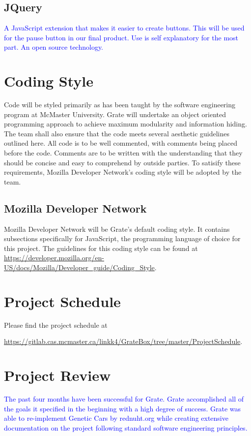 \documentclass{article}
\begin{document}
\subsection{JQuery}
\textcolor{blue}{
A JavaScript extension that makes it easier to create buttons. This will be used 
for the pause button in our final product. Use is self explanatory for the most 
part. An open source technology.}

\section{Coding Style}

Code will be styled primarily as has been taught by the software engineering 
program at McMaster University. Grate will undertake an object oriented 
programming approach to achieve maximum modularity and information hiding. The 
team shall also ensure that the code meets several aesthetic guidelines outlined 
here. All code is to be well commented, with comments being placed before the 
code. Comments are to be written with the understanding that they should be 
concise and easy to comprehend by outside parties. To satisify these 
requirements, Mozilla Developer Network's coding style will be adopted by the 
team. 

\subsection{Mozilla Developer Network}

Mozilla Developer Network will be Grate's default coding style. It contains 
subsections specifically for JavaScript, the programming language of choice for 
this project.  The guidelines for this coding style can be found at
\href{https://developer.mozilla.org/en-US/docs/Mozilla/Developer\_guide/Coding\_Style}{https://developer.mozilla.org/en-US/docs/Mozilla/Developer\_guide/Coding\_Style}.

\section{Project Schedule}
Please find the project schedule at 

\href{https://gitlab.cas.mcmaster.ca/linkk4/GrateBox/tree/master/ProjectSchedule} 
{https://gitlab.cas.mcmaster.ca/linkk4/GrateBox/tree/master/ProjectSchedule}.

\section{Project Review}
\textcolor{blue}{The past four months have been successful for Grate. Grate 
accomplished all of 
the goals it specified in the beginning with a high degree of success. Grate was 
able to re-implement Genetic Cars by rednuht.org while creating extensive 
documentation on the project following standard software engineering 
principles.}
\end{document}
